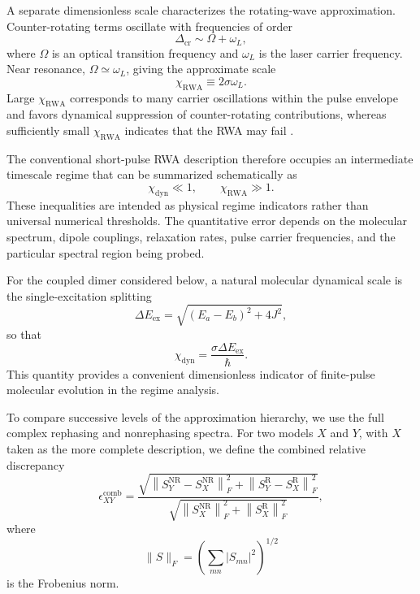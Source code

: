 A separate dimensionless scale characterizes the rotating-wave
approximation. Counter-rotating terms oscillate with frequencies of
order
%
\begin{equation}
\Delta_{\mathrm{cr}}
\sim
\Omega+\omega_L,
\end{equation}
%
where $\Omega$ is an optical transition frequency and $\omega_L$ is
the laser carrier frequency. Near resonance,
$\Omega\simeq\omega_L$, giving the approximate scale
%
\begin{equation}
\chi_{\mathrm{RWA}}
\equiv
2\sigma\omega_L .
\label{eq:chi_rwa}
\end{equation}
%
Large $\chi_{\mathrm{RWA}}$ corresponds to many carrier oscillations
within the pulse envelope and favors dynamical suppression of
counter-rotating contributions, whereas sufficiently small
$\chi_{\mathrm{RWA}}$ indicates that the RWA may fail
\cite{Smallwood2017FinitePulse,Tan2026RWA}.

The conventional short-pulse RWA description therefore occupies an
intermediate timescale regime that can be summarized schematically as
%
\begin{equation}
\boxed{
\chi_{\mathrm{dyn}}\ll 1,
\qquad
\chi_{\mathrm{RWA}}\gg 1 .
}
\label{eq:short_rwa_window}
\end{equation}
%
These inequalities are intended as physical regime indicators rather
than universal numerical thresholds. The quantitative error depends on
the molecular spectrum, dipole couplings, relaxation rates, pulse
carrier frequencies, and the particular spectral region being probed.

For the coupled dimer considered below, a natural molecular dynamical
scale is the single-excitation splitting
%
\begin{equation}
\Delta E_{\mathrm{ex}}
=
\sqrt{
(E_a-E_b)^2+4J^2
},
\label{eq:exciton_splitting}
\end{equation}
%
so that
%
\begin{equation}
\chi_{\mathrm{dyn}}
=
\frac{
\sigma\Delta E_{\mathrm{ex}}
}{
\hbar
}.
\label{eq:chi_dyn_dimer}
\end{equation}
%
This quantity provides a convenient dimensionless indicator of
finite-pulse molecular evolution in the regime analysis.

To compare successive levels of the approximation hierarchy, we use
the full complex rephasing and nonrephasing spectra. For two models
$X$ and $Y$, with $X$ taken as the more complete description, we
define the combined relative discrepancy
%
\begin{equation}
\epsilon_{XY}^{\mathrm{comb}}
=
\frac{
\sqrt{
\left\|
S_Y^{\mathrm{NR}}-S_X^{\mathrm{NR}}
\right\|_F^2
+
\left\|
S_Y^{\mathrm{R}}-S_X^{\mathrm{R}}
\right\|_F^2
}
}{
\sqrt{
\left\|
S_X^{\mathrm{NR}}
\right\|_F^2
+
\left\|
S_X^{\mathrm{R}}
\right\|_F^2
}
},
\label{eq:combined_error}
\end{equation}
%
where
%
\begin{equation}
\|S\|_F
=
\left(
\sum_{mn}
|S_{mn}|^2
\right)^{1/2}
\label{eq:frobenius_norm}
\end{equation}
%
is the Frobenius norm.

